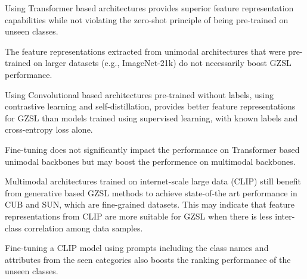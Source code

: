 \begin{compactitem}
\item Using Transformer based architectures provides superior feature representation capabilities while not violating the zero-shot principle of being pre-trained on unseen classes.

\item The feature representations extracted from unimodal architectures that were pre-trained on larger datasets (e.g., ImageNet-21k) do not necessarily boost GZSL performance.

\item Using Convolutional based architectures pre-trained without labels, using contrastive learning and self-distillation, provides better feature representations for GZSL than models trained using supervised learning, with known labels and cross-entropy loss alone.

\item Fine-tuning does not significantly impact the performance on Transformer based unimodal backbones but may boost the performence on multimodal backbones.

\item Multimodal architectures trained on internet-scale large data (CLIP) still benefit from generative based GZSL methods to achieve state-of-the art performance in CUB and SUN, which are fine-grained datasets. This may indicate that feature representations from CLIP are more suitable for GZSL when there is less inter-class correlation among data samples.

\item Fine-tuning a CLIP model using prompts including the class names and attributes 
from the seen categories also boosts the ranking performance of the unseen classes.
\end{compactitem}

